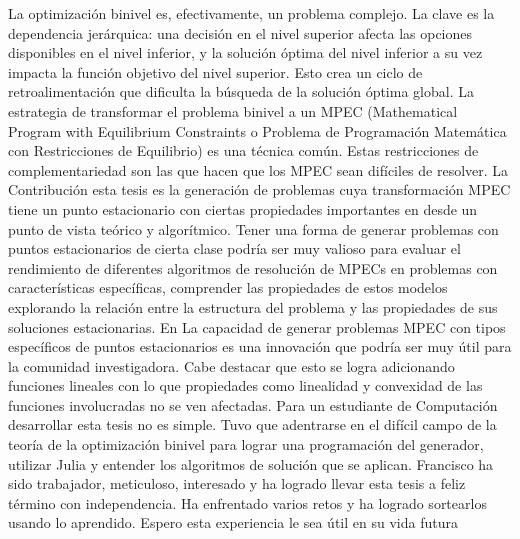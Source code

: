 \begin{opinion}
    La optimización binivel es, efectivamente, un problema complejo. La clave es la dependencia jerárquica: una decisión en el nivel superior afecta las opciones disponibles en el nivel inferior, y la solución óptima del nivel inferior a su vez impacta la función objetivo del nivel superior. Esto crea un ciclo de retroalimentación que dificulta la búsqueda de la solución óptima global. La estrategia de transformar el problema binivel a un MPEC (Mathematical Program with Equilibrium Constraints o Problema de Programación Matemática con Restricciones de Equilibrio) es una técnica común. Estas restricciones de complementariedad son las que hacen que los MPEC sean difíciles de resolver. La Contribución esta tesis es la generación de problemas cuya transformación MPEC tiene un punto estacionario con ciertas propiedades importantes en desde un punto de vista teórico y algorítmico. Tener una forma de generar problemas con puntos estacionarios de cierta clase podría ser muy valioso para evaluar el rendimiento de diferentes algoritmos de resolución de MPECs en problemas con características específicas, comprender las propiedades de estos modelos explorando la relación entre la estructura del problema y las propiedades de sus soluciones estacionarias. En
 La capacidad de generar problemas MPEC con tipos específicos de puntos estacionarios es una innovación que podría ser muy útil para la comunidad investigadora. Cabe destacar que esto se logra adicionando funciones lineales con lo que propiedades como linealidad y convexidad de las funciones involucradas no se ven afectadas.
Para un estudiante de Computación desarrollar esta tesis no es simple. Tuvo que adentrarse en el difícil campo de la teoría de la optimización binivel para lograr una programación del generador, utilizar Julia y entender los algoritmos de solución que se aplican.
Francisco ha sido trabajador, meticuloso, interesado y ha logrado llevar esta tesis a feliz término con independencia. Ha enfrentado varios retos y ha logrado sortearlos usando lo aprendido. Espero esta experiencia le sea útil en su vida futura
\end{opinion}